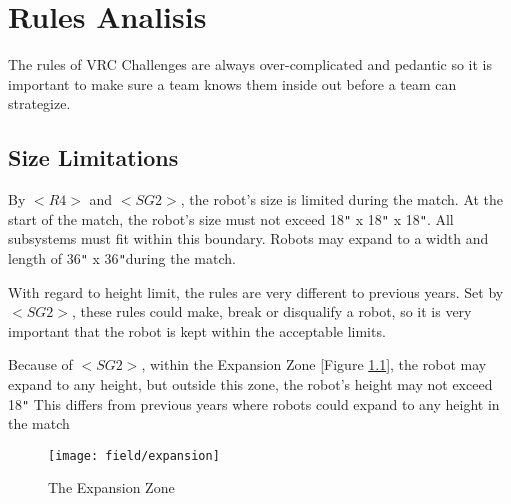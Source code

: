 \documentclass[../main.tex]{subfiles}
\begin{document}
\chapter{Rules Analisis}

The rules of VRC Challenges are always over-complicated and pedantic
so it is important to make sure a team knows them inside out before a team can
strategize.

\section{Size Limitations}

By $<R4>$ and $<SG2>$, the robot’s size is limited during the match. 
At the start of the match, the robot’s size must not exceed 18\verb+"+ x 18\verb+"+ x 18\verb+"+. 
All subsystems must fit within this boundary.
Robots may expand to a width and length of 36\verb+"+ x 36\verb+"+during the match. \par

With regard to height limit, the rules are very different to previous years.
Set by $<SG2>$, these rules could make, break or disqualify a robot,
so it is very important that the robot is kept within the acceptable limits. \par

Because of $<SG2>$, within the Expansion Zone [Figure \ref{fig:expansionzone}], the robot may expand to any height,
but outside this zone, the robot’s height may not exceed 18\verb+"+
This differs from previous years where robots could expand to any height in the match 
\par

\begin{figure}
    \texttt{[image: field/expansion]}
    \caption{The Expansion Zone}
   \label{fig:expansionzone}
\end{figure}
\end{document}

